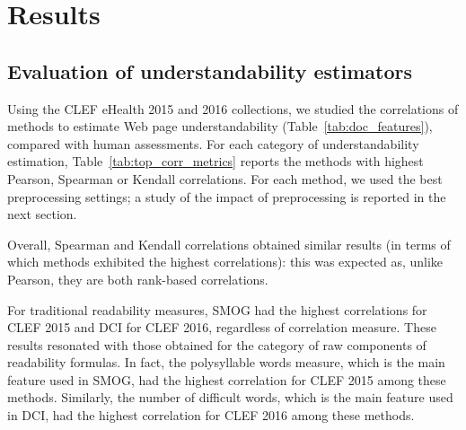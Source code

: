 
\section*{Results}
\subsection*{Evaluation of understandability estimators}
\label{sec:beyond_readability}




Using the CLEF eHealth 2015 and 2016 collections, we studied the correlations of methods to estimate Web page understandability (Table~\ref{tab:doc_features}), compared with human assessments. For each category of understandability estimation, Table~\ref{tab:top_corr_metrics} reports the methods with highest Pearson, Spearman or Kendall correlations. For each method, we used the best preprocessing settings; 
a study of the impact of preprocessing is reported in the next section.

Overall, Spearman and Kendall correlations obtained similar results (in terms of which methods exhibited the highest correlations): this was expected as, unlike Pearson, they are both rank-based correlations.

For traditional readability measures, SMOG had the highest correlations for CLEF 2015 and DCI for CLEF 2016, regardless of correlation measure. These results resonated with those obtained for the category of raw components of readability formulas. %
In fact, the polysyllable words measure, which is the main feature used in SMOG, had the highest correlation for CLEF 2015 among these methods. Similarly, the number of difficult words, which is the main feature used in DCI, had the highest correlation for CLEF 2016 among these methods.

